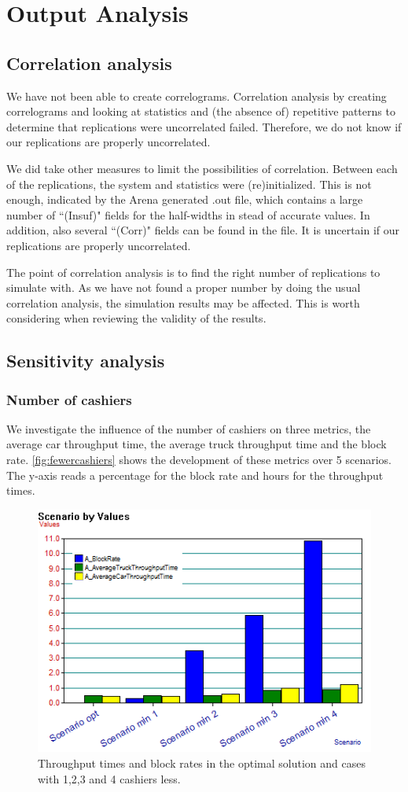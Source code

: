 \section{Output Analysis}
\subsection{Correlation analysis}
We have not been able to create correlograms.
Correlation analysis by creating correlograms and looking at statistics and (the absence of) repetitive patterns to determine that replications were uncorrelated failed.
Therefore, we do not know if our replications are properly uncorrelated.
 
We did take other measures to limit the possibilities of correlation.
Between each of the replications, the system and statistics were (re)initialized.
This is not enough, indicated by the Arena generated .out file, which contains a large number of ``(Insuf)" fields for the half-widths in stead of accurate values.
In addition, also several ``(Corr)" fields can be found in the file.
It is uncertain if our replications are properly uncorrelated.

The point of correlation analysis is to find the right number of replications to simulate with.
As we have not found a proper number by doing the usual correlation analysis, the simulation results may be affected.
This is worth considering when reviewing the validity of the results.

\subsection{Sensitivity analysis}
\subsubsection{Number of cashiers}
We investigate the influence of the number of cashiers on three metrics, the average car throughput time, the average truck throughput time and the block rate.
\autoref{fig:fewercashiers} shows the development of these metrics over 5 scenarios.
The y-axis reads a percentage for the block rate and hours for the throughput times.

\begin{figure}[ht!]
	\centering
	\includegraphics[width=.75\textwidth]{images/fewerCashiers.png}
	\caption{Throughput times and block rates in the optimal solution and cases with 1,2,3 and 4 cashiers less.}
	\label{fig:fewercashiers}
\end{figure}

